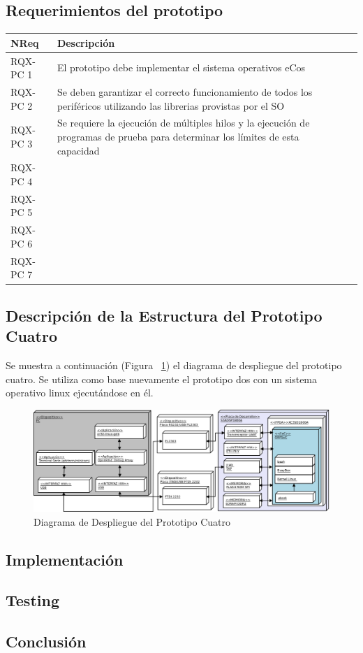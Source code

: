 		\subsection{Requerimientos del prototipo}
		
		\begin{table}[h]
		\centering	
		\begin{tabular}{ p{2.5cm} p{8cm} p{3cm} }
		\hline 
		\rowcolor[gray]{0.8} N\textordmasculine Req & Descripción\\
		\hline 
		RQX-PC 1 & El prototipo debe implementar el sistema operativos eCos\\ 
		\hline 
		RQX-PC 2 & Se deben garantizar el correcto funcionamiento de todos los periféricos utilizando las librerias provistas por el SO\\ 
		\hline 
		RQX-PC 3 & Se requiere la ejecución de múltiples hilos y la ejecución de programas de prueba para determinar los límites de esta capacidad \\ 
		\hline
		RQX-PC 4 & \\
		\hline
		RQX-PC 5 & \\
		\hline
		RQX-PC 6 & \\
		\hline
		RQX-PC 7 & \\
		\hline		
		\end{tabular}
		\end{table}
		
		\subsection{Descripción de la Estructura del Prototipo Cuatro}
		Se muestra a continuación (Figura ~\ref{fig:proto4}) el diagrama de despliegue del prototipo cuatro. Se utiliza como base nuevamente el prototipo
		dos con un sistema operativo linux ejecutándose en él.

		\begin{figure}[h!]
 		\begin{center}
  		\includegraphics[width=1\textwidth,keepaspectratio=true]{./images/proto4}
  		\caption{Diagrama de Despliegue del Prototipo Cuatro}
  		\label{fig:proto4} 
 		\end{center}
		\end{figure}
	
		\newpage

		\subsection{Implementación}	
		
		\subsection{Testing}
		
		\subsection{Conclusión}
